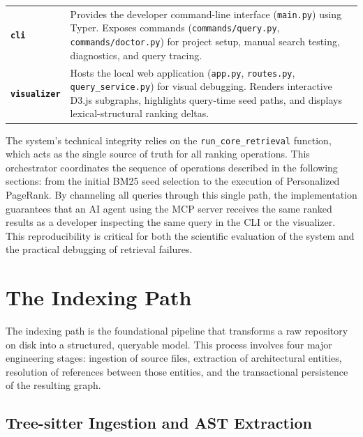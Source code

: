 \begin{table}[H]
\begin{tabularx}{\textwidth}{@{} >{\raggedright\arraybackslash}p{5.2cm} >{\raggedright\arraybackslash}X @{}}
        \addlinespace[3pt]
        \textbf{\texttt{cli}} &
        Provides the developer command-line interface (\texttt{main.py}) using Typer. Exposes commands (\texttt{commands/query.py}, \texttt{commands/doctor.py}) for project setup, manual search testing, diagnostics, and query tracing. \\
        \addlinespace[3pt]
        \textbf{\texttt{visualizer}} &
        Hosts the local web application (\texttt{app.py}, \texttt{routes.py}, \texttt{query\_service.py}) for visual debugging. Renders interactive D3.js subgraphs, highlights query-time seed paths, and displays lexical-structural ranking deltas. \\
        \bottomrule
    \end{tabularx}
\end{table}

The system's technical integrity relies on the \texttt{run\_core\_retrieval} function, which acts as the single source of truth for all ranking operations. This orchestrator coordinates the sequence of operations described in the following sections: from the initial BM25 seed selection to the execution of Personalized PageRank. By channeling all queries through this single path, the implementation guarantees that an AI agent using the MCP server receives the same ranked results as a developer inspecting the same query in the CLI or the visualizer. This reproducibility is critical for both the scientific evaluation of the system and the practical debugging of retrieval failures.

\section{The Indexing Path}
\label{sec:indexing-path}

The indexing path is the foundational pipeline that transforms a raw repository on disk into a structured, queryable model. This process involves four major engineering stages: ingestion of source files, extraction of architectural entities, resolution of references between those entities, and the transactional persistence of the resulting graph.

\subsection{Tree-sitter Ingestion and AST Extraction}
\label{subsec:parser-ingestion}

